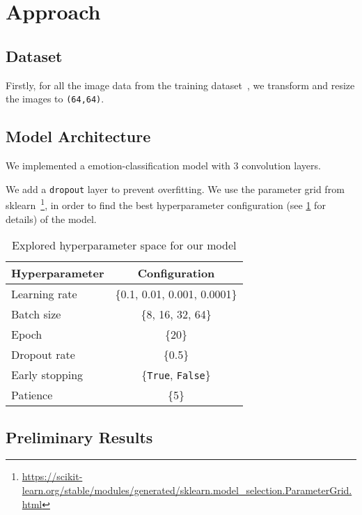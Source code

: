 \section{Approach}
\label{sec:approach}

\subsection{Dataset}
Firstly, 
for all the image data from the training dataset~\cite{li2017reliable,li2019reliable}, 
we transform and resize the images to \texttt{(64,64)}. 

\subsection{Model Architecture}
We implemented a emotion-classification model with 3 convolution layers.

We add a \texttt{dropout} layer to prevent overfitting.
We use the parameter grid from sklearn~\footnote{\url{https://scikit-learn.org/stable/modules/generated/sklearn.model_selection.ParameterGrid.html}}, 
in order to find the best hyperparameter configuration (see \cref{tab:hyper} for details) of the model.

\begin{table}
    \centering
    \begin{tabular}{@{}lc@{}}
      \toprule
      Hyperparameter & Configuration \\
      \midrule
      Learning rate & \{0.1, 0.01, 0.001, 0.0001\}  \\
      Batch size & \{8, 16, 32, 64\} \\
      Epoch & \{20\} \\
      Dropout rate & \{0.5\} \\
      Early stopping & \{\texttt{True}, \texttt{False}\} \\
      Patience & \{5\} \\
      \bottomrule
    \end{tabular}
    \caption{Explored hyperparameter space for our model}
    \label{tab:hyper}
  \end{table}

\subsection{Preliminary Results}